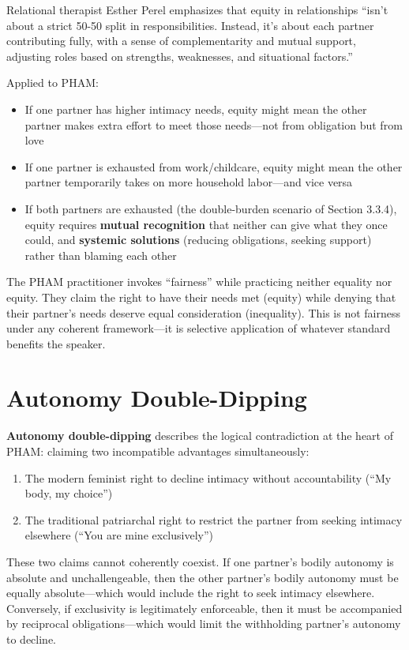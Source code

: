 \documentclass[12pt,openany]{book}
\numberwithin{equation}{chapter}
\begin{document}
Relational therapist Esther Perel emphasizes that equity in relationships ``isn't about a strict 50-50 split in responsibilities. Instead, it's about each partner contributing fully, with a sense of complementarity and mutual support, adjusting roles based on strengths, weaknesses, and situational factors.''

Applied to PHAM:
\begin{itemize}
    \item If one partner has higher intimacy needs, equity might mean the other partner makes extra effort to meet those needs---not from obligation but from love
    \item If one partner is exhausted from work/childcare, equity might mean the other partner temporarily takes on more household labor---and vice versa
    \item If both partners are exhausted (the double-burden scenario of Section 3.3.4), equity requires \textbf{mutual recognition} that neither can give what they once could, and \textbf{systemic solutions} (reducing obligations, seeking support) rather than blaming each other
\end{itemize}

The PHAM practitioner invokes ``fairness'' while practicing neither equality nor equity. They claim the right to have their needs met (equity) while denying that their partner's needs deserve equal consideration (inequality). This is not fairness under any coherent framework---it is selective application of whatever standard benefits the speaker.

\section{Autonomy Double-Dipping}

\textbf{Autonomy double-dipping} describes the logical contradiction at the heart of PHAM: claiming two incompatible advantages simultaneously:

\begin{enumerate}
    \item The modern feminist right to decline intimacy without accountability (``My body, my choice'')
    \item The traditional patriarchal right to restrict the partner from seeking intimacy elsewhere (``You are mine exclusively'')
\end{enumerate}

These two claims cannot coherently coexist. If one partner's bodily autonomy is absolute and unchallengeable, then the other partner's bodily autonomy must be equally absolute---which would include the right to seek intimacy elsewhere. Conversely, if exclusivity is legitimately enforceable, then it must be accompanied by reciprocal obligations---which would limit the withholding partner's autonomy to decline.
\end{document}
